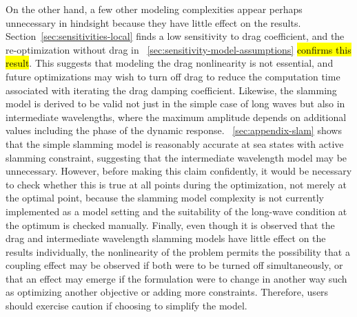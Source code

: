 On the other hand, a few other modeling complexities appear perhaps unnecessary in hindsight because they have little effect on the results.
Section~\ref{sec:sensitivities-local} finds a low sensitivity to drag coefficient, and the re-optimization without drag in \sectionautorefname~\ref{sec:sensitivity-model-assumptions} \hl{confirms this result}.
This suggests that modeling the drag nonlinearity is not essential, and future optimizations may wish to turn off drag to reduce the computation time associated with iterating the drag damping coefficient.
Likewise, the slamming model is derived to be valid not just in the simple case of long waves but also in intermediate wavelengths, where the maximum amplitude depends on additional values including the phase of the dynamic response.
\appendixautorefname~\ref{sec:appendix-slam} shows that the simple slamming model is reasonably accurate at sea states with active slamming constraint, suggesting that the intermediate wavelength model may be unnecessary.
However, before making this claim confidently, it would be necessary to check whether this is true at all points during the optimization, not merely at the optimal point, because the slamming model complexity is not currently implemented as a model setting and the suitability of the long-wave condition at the optimum is checked manually. %
Finally, even though it is observed that the drag and intermediate wavelength slamming models have little effect on the results individually, the nonlinearity of the problem permits the possibility that a coupling effect may be observed if both were to be turned off simultaneously, or that an effect may emerge if the formulation were to change in another way such as optimizing another objective or adding more constraints.
Therefore, users should exercise caution if choosing to simplify the model.

